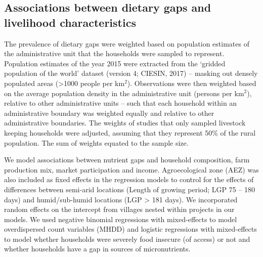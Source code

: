 \subsection{Associations between dietary gaps and livelihood characteristics}

The prevalence of dietary gaps were weighted based on population estimates of the administrative unit that the households were sampled to represent. Population estimates of the year 2015 were extracted from the `gridded population of the world' dataset (version 4; CIESIN, 2017) -- masking out densely populated areas (>1000 people per km$^2$). Observations were then weighted based on the average population density in the administrative unit (persons per km$^2$), relative to other administrative units -- such that each household within an administrative boundary was weighted equally and relative to other administrative boundaries. The weights of studies that only sampled livestock keeping households were adjusted, assuming that they represent 50\% of the rural population. The sum of weights equated to the sample size.

We model associations between nutrient gaps and household composition, farm production mix, market participation and income. Agroecological zone (AEZ) was also included as fixed effects in the regression models to control for the effects of differences between semi-arid locations (Length of growing period; LGP 75 -- 180 days) and humid/sub-humid locations (LGP {\textgreater} 181 days). We incorporated random effects on the intercept from villages nested within projects in our models. We used negative binomial regressions with mixed-effects to model overdispersed count variables (MHDD) and logistic regressions with mixed-effects to model whether households were severely food insecure (of access) or not and whether households have a gap in sources of micronutrients.

